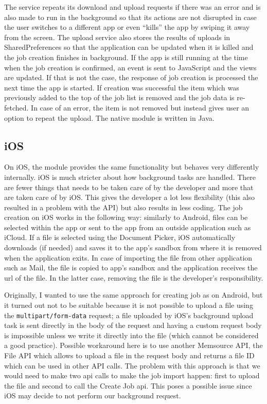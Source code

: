 The service repeats its download and upload requests if there was an error and is also made to run in the background so that its actions are not disrupted in case the user switches to a different app or even “kills” the app by swiping it away from the screen. The upload service also stores the results of uploads in SharedPreferences so that the application can be updated when it is killed and the job creation finishes in background.
If the app is still running at the time when the job creation is confirmed, an event is sent to JavaScript and the views are updated. If that is not the case, the response of job creation is processed the next time the app is started. If creation was successful the item which was previously added to the top of the job list is removed and the job data is re-fetched. In case of an error, the item is not removed but instead gives user an option to repeat the upload. The native module is written in Java. 
 

\subsection{iOS}
On iOS, the module provides the same functionality but behaves very differently internally. iOS is much stricter about how background tasks are handled. There are fewer things that needs to be taken care of by the developer and more that are taken care of by iOS. This gives the developer a lot less flexibility (this also resulted in a problem with the API) but also results in less coding. The job creation on iOS works in the following way: similarly to Android, files can be selected within the app or sent to the app from an outside application such as iCloud. If a file is selected using the Document Picker, iOS automatically downloads (if needed) and saves it to the app’s sandbox from where it is removed when the application exits. In case of importing the file from other application such as Mail, the file is copied to app's sandbox and the application receives the url of the file. In the latter case, removing the file is the developer's responsibility.

Originally, I wanted to use the same approach for creating job as on Android, but it turned out not to be suitable because it is not possible to upload a file using the \texttt{multipart/form-data} request; a file uploaded by iOS's background upload task is sent directly in the body of the request and having a custom request body is impossible unless we write it directly into the file (which cannot be considered a good practice). Possible workaround here is to use another Memsource API, the File API which allows to upload a file in the request body and returns a file ID which can be used in other API calls. The problem with this approach is that we would need to make two api calls to make the job import happen: first to upload the file and second to call the Create Job api. This poses a possible issue since iOS may decide to not perform our background request. 

